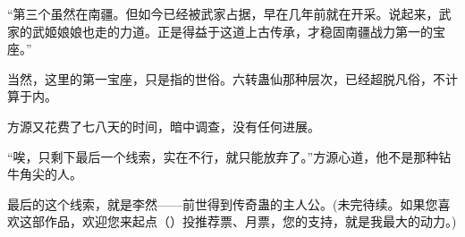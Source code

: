 \begin{this_body}
“第三个虽然在南疆。但如今已经被武家占据，早在几年前就在开采。说起来，武家的武姬娘娘也走的力道。正是得益于这道上古传承，才稳固南疆战力第一的宝座。”

当然，这里的第一宝座，只是指的世俗。六转蛊仙那种层次，已经超脱凡俗，不计算于内。

方源又花费了七八天的时间，暗中调查，没有任何进展。

“唉，只剩下最后一个线索，实在不行，就只能放弃了。”方源心道，他不是那种钻牛角尖的人。

最后的这个线索，就是李然——前世得到传奇蛊的主人公。(未完待续。如果您喜欢这部作品，欢迎您来起点（）投推荐票、月票，您的支持，就是我最大的动力。)

\end{this_body}

